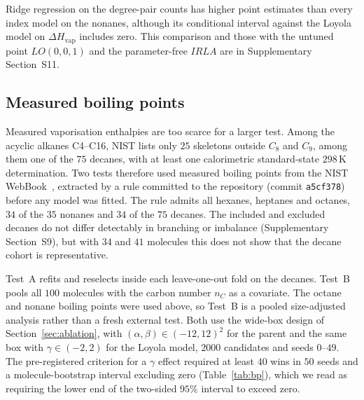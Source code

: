 \documentclass[a5paper, 10pt]{article}
\theoremstyle{plain}
\theoremstyle{remark}
\theoremstyle{definition}
\begin{document}
Ridge regression on the degree-pair counts has higher point estimates than every index model on the nonanes, although its conditional interval against the Loyola model on $\Delta H_{\mathrm{vap}}$ includes zero. This comparison and those with the untuned point $LO(0,0,1)$ and the parameter-free $IRLA$ are in Supplementary Section~S11.

\subsection{Measured boiling points}\label{sec:bp}

Measured vaporisation enthalpies are too scarce for a larger test. Among
the acyclic alkanes C4--C16, NIST lists only $25$ skeletons outside $C_8$
and $C_9$, among them one of the $75$ decanes, with at least one calorimetric standard-state
$298$\,K determination. Two tests therefore used measured boiling
points from the NIST WebBook~\cite{NISTWebBook}, extracted by a rule
committed to the repository (commit \texttt{a5cf378}) before any model
was fitted. The rule admits all hexanes, heptanes and octanes, $34$ of
the $35$ nonanes and $34$ of the $75$ decanes. The included and
excluded decanes do not differ detectably in branching or imbalance
(Supplementary Section~S9), but with $34$ and $41$ molecules this does
not show that the decane cohort is representative.

Test~A refits and
reselects inside each leave-one-out fold on the decanes. Test~B pools
all $100$ molecules with the carbon number $n_C$ as a covariate. The
octane and nonane boiling points were used above, so Test~B is a pooled
size-adjusted analysis rather than a fresh external test. Both use the
wide-box design of Section~\ref{sec:ablation}, with
$(\alpha,\beta) \in (-12,12)^2$ for the parent and the same box with
$\gamma \in (-2,2)$ for the Loyola model, $2000$ candidates and seeds
$0$--$49$. The pre-registered criterion for a $\gamma$ effect required
at least $40$ wins in $50$ seeds and a molecule-bootstrap interval
excluding zero (Table~\ref{tab:bp}), which we read as requiring the lower end of the two-sided $95\%$ interval to exceed zero.
\end{document}
